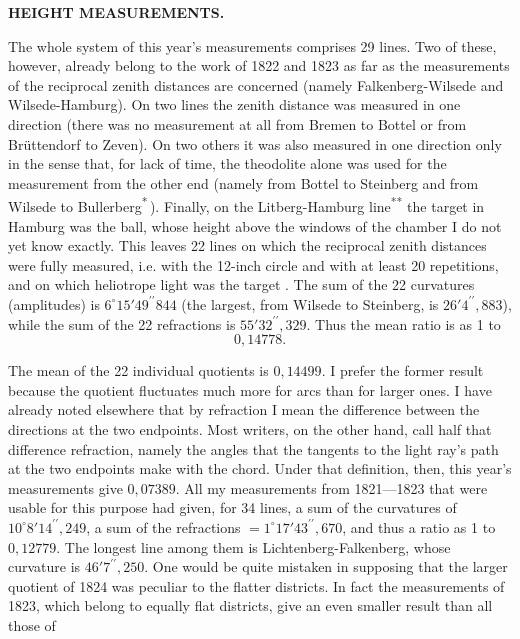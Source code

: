 \par\clearpage
\noindent\null\hfill{\small\textbf{HEIGHT MEASUREMENTS.}}\hfill{}\par\medskip
\par\noindent\hspace*{\parindent}The whole system of this year's measurements comprises 29 lines. Two of these, however,
already belong to the work of 1822 and 1823 as far as the measurements of the reciprocal
zenith distances are concerned (namely Falkenberg-Wilsede and Wilsede-Hamburg).
On two lines the zenith distance was measured in one direction  (there was no
measurement at all from Bremen to Bottel or from Brüttendorf to Zeven). On two others
it was also measured in one direction only in the sense that, for lack of time, the
theodolite alone was used for the measurement from the other end (namely from Bottel
to Steinberg and from Wilsede to Bullerberg\textsuperscript{*}\,). Finally, on the Litberg-Hamburg
line\textsuperscript{**} the target in Hamburg was the ball, whose height above the windows of
the chamber I do not yet know exactly. This leaves 22 lines on which the reciprocal
zenith distances were fully measured, i.e. with the 12-inch circle and with at least
20 repetitions, and on which heliotrope light was the target .
The sum of the 22 curvatures (amplitudes) is \(6^\circ15'49^{\prime\prime}844\) (the largest,
from Wilsede to Steinberg, is \(26'4^{\prime\prime}{,}883\)), while the sum of the 22 refractions
is \(55'32^{\prime\prime}{,}329\). Thus the mean ratio is as 1 to
\[0{,}14778.\]
\par\noindent\hspace*{\parindent}The mean of the 22 individual quotients is \(0{,}14499\). I prefer the former result
because the quotient fluctuates much more for  arcs than for larger ones.
I have already noted elsewhere that by refraction I mean the difference between the
directions at the two endpoints. Most writers, on the other hand, call half that
difference refraction, namely the angles that the tangents to the light ray's path
at the two endpoints make with the chord. Under that definition, then, this year's
measurements give \(0{,}07389\). All my measurements from 1821---1823 that were usable for
this purpose had given, for 34 lines, a sum of the curvatures of \(10^\circ8'14^{\prime\prime}{,}249\),
a sum of the refractions \(=1^\circ17'43^{\prime\prime}{,}670\), and thus a ratio as 1 to \(0{,}12779\).
The longest line among them is Lichtenberg-Falkenberg, whose curvature is
\(46'7^{\prime\prime}{,}250\). One would be quite mistaken in supposing that the larger
quotient of 1824 was peculiar to the flatter districts. In fact the measurements
of 1823, which belong to equally flat districts, give an even smaller result than
all those of
\par\medskip\noindent\hspace*{0.03\linewidth}{\footnotesize IX.}\hfill{}\par

